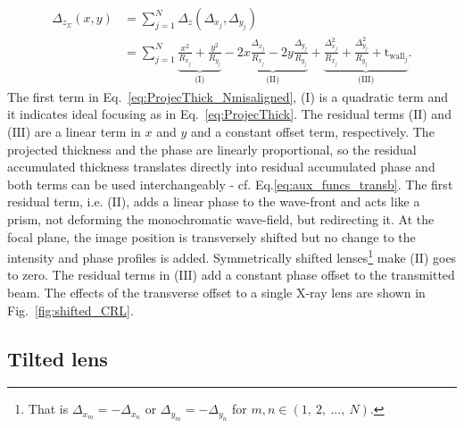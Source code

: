 \begin{refsection}
\begin{align}\label{eq:ProjecThick_Nmisaligned}
    \Delta_{z_\Sigma}(x,y) &= \sum\limits_{j=1}^N \Delta_z(\Delta_{x_j},\Delta_{y_j})\nonumber\\
    &=\sum\limits_{j=1}^N \underbrace{\frac{x^2}{R_{x_j}}+\frac{y^2}{R_{y_j}}}_\text{(I)}
    -\underbrace{2x\frac{\Delta_{x_j}}{R_{x_j}} - 2y\frac{\Delta_{y_j}}{R_{y_j}}}_\text{(II)}
    +\underbrace{\frac{\Delta_{x_j}^2}{R_{x_j}}+\frac{\Delta_{y_j}^2}{R_{y_j}}+\text{t}_{\text{wall}_j}}_\text{(III)}.
\end{align}
The first term in Eq.~\ref{eq:ProjecThick_Nmisaligned}, ($\text{I}$) is a quadratic term and it indicates ideal focusing as in Eq.~\ref{eq:ProjecThick}. The residual terms ($\text{II}$) and ($\text{III}$) are a linear term in $x$ and $y$ and a constant offset term, respectively. The projected thickness and the phase are linearly proportional, so the residual accumulated thickness translates directly into residual accumulated phase and both terms can be used interchangeably - cf. Eq.\ref{eq:aux_funcs_transb}. The first residual term, i.e. ($\text{II}$), adds a linear phase to the wave-front and acts like a prism, not deforming the monochromatic wave-field, but redirecting it. At the focal plane, the image position is transversely shifted but no change to the intensity and phase profiles is added. Symmetrically shifted lenses\footnote{That is $\Delta_{x_m}=-\Delta_{x_n}$ or $\Delta_{y_m}=-\Delta_{y_n}$ for $m,n\in(1,~2,~...,~N)$.} make ($\text{II}$) goes to zero. The residual terms in ($\text{III}$) add a constant phase offset to the transmitted beam. The effects of the transverse offset to a single X-ray lens are shown in Fig.~\ref{fig:shifted_CRL}.



\subsection{Tilted lens}



\end{refsection}
